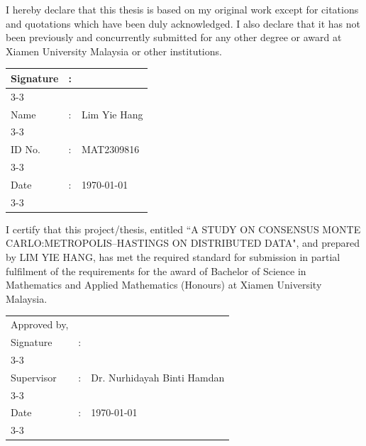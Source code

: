 \documentclass[12pt]{xmumthesis}
\newcommand{\studentname}{Lim Yie Hang}%
\newcommand{\studentid}{MAT2309816}%
\newcommand{\supervisor}{Dr. Nurhidayah Binti Hamdan}%
\newcommand{\thesistitlea}{A STUDY ON CONSENSUS MONTE CARLO:}%
\newcommand{\thesistitleb}{METROPOLIS--HASTINGS ON DISTRIBUTED DATA}%
\newcommand{\studentnameupper}{\expandafter\MakeUppercase
                           \expandafter{\studentname}}
\newcommand{\thesistitleupper}{\thesistitlea\space\thesistitleb}
\begin{document}
\begin{romanpages}              %

\begin{declaration}

I hereby declare that this thesis is based on my original work except for citations and quotations which have been 
duly acknowledged. I also declare that it has not been previously and concurrently submitted for any other degree or award 
at Xiamen University Malaysia or other institutions.
\\[15ex]

\begin{tabular}{llp{10cm}}
Signature & : & \\\cline{3-3}\\[2ex]
Name & : &  \studentname  \\\cline{3-3}\\[2ex]
ID No. & : &  \studentid \\ \cline{3-3}\\[2ex]
Date & : & \today\\\cline{3-3}
\end{tabular}

\end{declaration}


\begin{approval}

I certify that this project/thesis, entitled ``\thesistitleupper", 
and prepared by \studentnameupper, has met the required standard for submission in partial fulfilment of the requirements
for the award of Bachelor of Science in Mathematics and Applied Mathematics (Honours) at Xiamen University Malaysia.
\\[30ex]

\begin{tabular}{llp{9cm}}
Approved by, & & \\[7.5ex]
Signature & : &   \\ \cline{3-3}\\[2.5ex]
Supervisor & : & \supervisor \\\cline{3-3}\\[2.5ex]
Date & : & \today \\\cline{3-3}\\[10ex]


\end{tabular}
\end{approval}
\end{romanpages}
\end{document}
